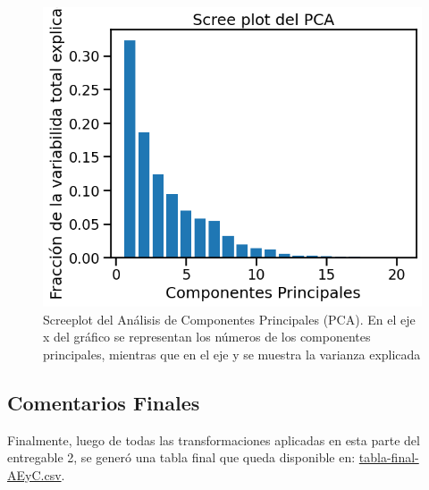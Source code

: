 \begin{figure} [!t]
\begin{center}
\includegraphics[width=0.6\columnwidth]{img/PCA.png}
\caption{Screeplot del Análisis de Componentes Principales (PCA). En el eje x del gráfico se representan los números de los componentes principales, mientras que en el eje y se muestra la varianza explicada}
\label{pca}
\end{center}
\end{figure}


\subsection*{Comentarios Finales}
Finalmente, luego de todas las transformaciones aplicadas en esta parte del entregable 2, se generó una tabla final que queda disponible en: \href{
https://raw.githubusercontent.com/sebascoca/DiploDatos2023/main/AnalisisYCuracion/Practico/tablafinalAEyC.csv}{tabla-final-AEyC.csv}. 







